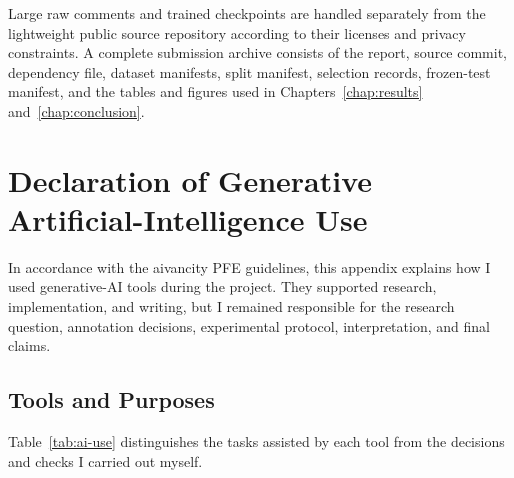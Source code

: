 \documentclass[12pt, a4paper, twoside, openany]{report}
\begin{document}
Large raw comments and trained checkpoints are handled separately from the lightweight public source repository according to their licenses and privacy constraints. A complete submission archive consists of the report, source commit, dependency file, dataset manifests, split manifest, selection records, frozen-test manifest, and the tables and figures used in Chapters~\ref{chap:results} and~\ref{chap:conclusion}.

\chapter{Declaration of Generative Artificial-Intelligence Use}
\label{app:ai-declaration}

In accordance with the aivancity PFE guidelines, this appendix explains how I used generative-AI tools during the project. They supported research, implementation, and writing, but I remained responsible for the research question, annotation decisions, experimental protocol, interpretation, and final claims.

\section{Tools and Purposes}

Table~\ref{tab:ai-use} distinguishes the tasks assisted by each tool from the decisions and checks I carried out myself.
\end{document}
